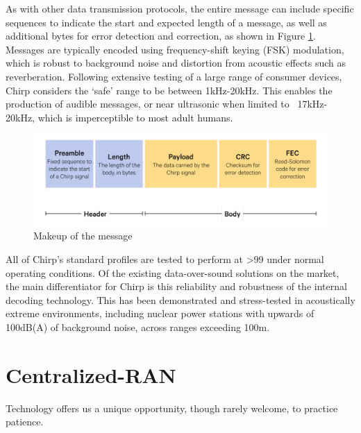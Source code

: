 \documentclass[notitlepage,hidelinks]{article}
\begin{document}
As with other data transmission protocols, the entire message can include
specific sequences to indicate the start and expected length of a message, as
well as additional bytes for error detection and correction, as shown in Figure
\ref{fig:dos_message}. Messages are typically encoded using frequency-shift
keying (FSK) modulation, which is robust to background noise and distortion
from acoustic effects such as reverberation. Following extensive testing of a
large range of consumer devices, Chirp considers the ‘safe’ range to be between
1kHz-20kHz. This enables the production of audible messages, or near ultrasonic
when limited to ~17kHz-20kHz, which is imperceptible to most adult humans. 

\begin{figure}[!h]
  \includegraphics[width=\linewidth]{res/dos_message.png}
    \caption{Makeup of the message}
  \label{fig:dos_message}
\end{figure}

All of Chirp’s standard profiles are tested to perform at >99%
under normal operating conditions. Of the existing data-over-sound solutions
on the market, the main differentiator for Chirp is this reliability and
robustness of the internal decoding technology. This has been demonstrated and
stress-tested in acoustically extreme environments, including nuclear power
stations with upwards of 100dB(A) of background noise, across ranges exceeding
100m.

\nocite{chirp17}
\printbibliography[heading=subbibliography]


\newpage
\section{Centralized-RAN}

\epigraph{Technology offers us a unique opportunity, 
though rarely welcome, to practice patience.}
{\parencite{patience12}}

\end{document}
